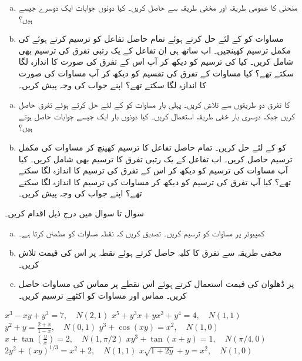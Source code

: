 \begin{enumerate}[a.]

\item
منحنی  کا  عمومی طریقہ اور مخفی طریقہ سے حاصل کریں۔ کیا دونوں جوابات ایک دوسرے جیسے ہیں؟
\item
مساوات  کو  کے لئے حل کرتے ہوئے تمام حاصل تفاعل کو ترسیم کرتے ہوئے  کی مکمل ترسیم کھینچیں۔ اب ساتھ ہی ان تفاعل کے یک رتبی تفرق کی ترسیم بھی شامل کریں۔ کیا  کی ترسیم کو دیکھ کر آپ اس کے تفرق کی صورت کا اندازہ لگا سکتے تھے؟ کیا مساوات کے تفرق کی تقسیم کو دیکھ کر آپ مساوات کی صورت کا اندازہ لگا سکتے تھے؟ اپنے جواب کی وجہ پیش کریں۔
\end{enumerate}
\begin{enumerate}[a.]

\item
{} کا تفرق  دو طریقوں سے تلاش کریں۔ پہلی بار مساوات کو  کے لئے حل کرتے ہوئے تفرق حاصل کریں جبکہ دوسری بار  خفی طریقہ استعمال کریں۔ کیا دونوں بار ایک جیسے جوابات حاصل ہوتے ہیں؟
\item
{} کو  کے لئے حل کریں۔ تمام حاصل تفاعل کا ترسیم کھینچ کر مساوات  کی مکمل ترسیم حاصل کریں۔ اب تفاعل کے یک رتبی تفرق کا ترسیم بھی شامل کریں۔ کیا آپ مساوات کی ترسیم کو دیکھ کر اس کے تفرق کی ترسیم کا اندازہ لگا سکتے تھے؟ کیا آپ تفرق کی ترسیم کو دیکھ کر مساوات کی ترسیم کا اندازہ لگا سکتے تھے؟ اپنے جواب کی وجہ پیش کریں۔
\end{enumerate}
سوال  تا سوال  میں درج ذیل اقدام کریں۔
\begin{enumerate}[a.]

\item
کمپیوٹر پر مساوات کو ترسیم کریں۔ تصدیق کریں کہ نقطہ  مساوات کو مطمئن کرتا ہے۔
\item
مخفی طریقہ سے تفرق  کا کلیہ حاصل کرتے ہوئے نقطہ  پر اس  کی قیمت تلاش کریں۔
\item
{} پر ڈھلوان کی قیمت استعمال کرتے ہوئے اس نقطے پر مماس کی مساوات حاصل کریں۔ مماس اور مساوات کو اکٹھے ترسیم کریں۔
\end{enumerate}


$x^3-xy+y^3=7,\quad N(2,1)$
$x^5+y^3x+yx^2+y^4=4,\quad N(1,1)$
$y^2+y=\tfrac{2+x}{1-x},\quad N(0,1)$
$y^3+\cos (xy)=x^2,\quad N(1,0)$
$x+\tan(\tfrac{y}{x})=2,\quad N(1,\pi/2)$
$xy^3+\tan(x+y)=1,\quad N(\pi/4,0)$
$2y^2+(xy)^{1/3}=x^2+2,\quad N(1,1)$
$x\sqrt{1+2y}+y=x^2,\quad N(1,0)$

